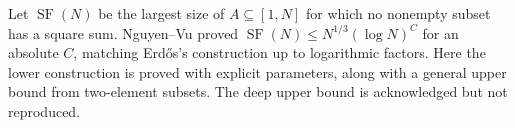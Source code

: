 Let $\operatorname{SF}(N)$ be the largest size of $A\subseteq[1,N]$ for which no nonempty subset has a square sum. Nguyen--Vu proved $\operatorname{SF}(N)\leq N^{1/3}(\log N)^C$ for an absolute $C$, matching Erd\H{o}s's construction up to logarithmic factors. Here the lower construction is proved with explicit parameters, along with a general upper bound from two-element subsets. The deep upper bound is acknowledged but not reproduced.

